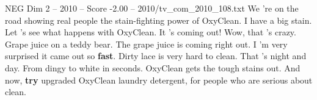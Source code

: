\begin{textsample}{NEG Dim 2 – 2010 – Score -2.00 – 2010/tv\_com\_2010\_108.txt}  \label{ex:f2_neg_052}
We 're on the road showing real people the stain-fighting power of OxyClean.
I have a big stain.
Let 's see what happens with OxyClean.
It 's coming out!
Wow, that 's crazy.
Grape juice on a teddy bear.
The grape juice is coming right out.
I 'm very surprised it came out so \textbf{fast}.
Dirty lace is very hard to clean.
That 's night and day.
From dingy to white in seconds.
OxyClean gets the tough stains out.
And now, \textbf{try} upgraded OxyClean laundry detergent, for people who are serious about clean.

\end{textsample}
